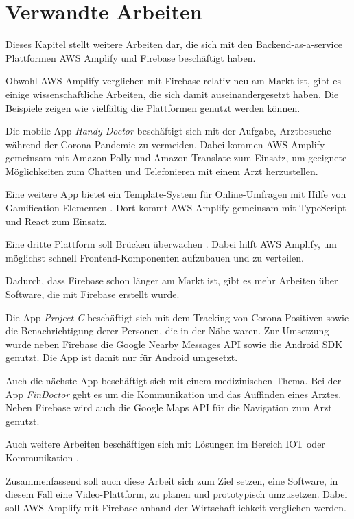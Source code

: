 \chapter{Verwandte Arbeiten}
\label{kap3}

Dieses Kapitel stellt weitere Arbeiten dar, die sich mit den Backend-as-a-service Plattformen \ac{AWS} Amplify und Firebase beschäftigt haben.

Obwohl \ac{AWS} Amplify verglichen mit Firebase relativ neu am Markt ist, gibt es einige wissenschaftliche Arbeiten, die sich damit auseinandergesetzt haben. Die Beispiele zeigen wie vielfältig die Plattformen genutzt werden können.

Die mobile App \textit{Handy Doctor} \autocite{st2021handy} beschäftigt sich mit der Aufgabe, Arztbesuche während der Corona-Pandemie zu vermeiden. Dabei kommen \ac{AWS} Amplify gemeinsam mit Amazon Polly und Amazon Translate zum Einsatz, um geeignete Möglichkeiten zum Chatten und Telefonieren mit einem Arzt herzustellen.

Eine weitere App bietet ein Template-System für Online-Umfragen mit Hilfe von Gamification-Elementen \autocite{kuwamura2021application}. Dort kommt AWS Amplify gemeinsam mit TypeScript und React zum Einsatz.

Eine dritte Plattform soll Brücken überwachen \autocite{naraharisetty2021cloud}. Dabei hilft \ac{AWS} Amplify, um möglichst schnell Frontend-Komponenten aufzubauen und zu verteilen.

Dadurch, dass Firebase schon länger am Markt ist, gibt es mehr Arbeiten über Software, die mit Firebase erstellt wurde.

Die App \textit{Project C} \autocite{rahman2021project} beschäftigt sich mit dem Tracking von Corona-Positiven sowie die Benachrichtigung derer Personen, die in der Nähe waren. Zur Umsetzung wurde neben Firebase die Google Nearby Messages API sowie die Android SDK genutzt. Die App ist damit nur für Android umgesetzt.

Auch die nächste App beschäftigt sich mit einem medizinischen Thema. Bei der App \textit{FinDoctor} \autocite{rahmi2017findoctor} geht es um die Kommunikation und das Auffinden eines Arztes. Neben Firebase wird auch die Google Maps API für die Navigation zum Arzt genutzt.

Auch weitere Arbeiten beschäftigen sich mit Lösungen im Bereich IOT oder Kommunikation \autocite{li2018justiot} \autocite{sharma2019firebase} \autocite{bhadoria2020chatapp} \autocite{khawas2018application}.

Zusammenfassend soll auch diese Arbeit sich zum Ziel setzen, eine Software, in diesem Fall eine Video-Plattform, zu planen und prototypisch umzusetzen. Dabei soll \ac{AWS} Amplify mit Firebase anhand der Wirtschaftlichkeit verglichen werden.